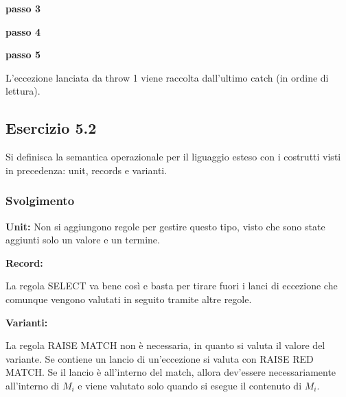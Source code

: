 \textbf{passo 3} 
\begin{prooftree}    
\end{prooftree}

\textbf{passo 4} 
\begin{prooftree}    
\end{prooftree}

\textbf{passo 5} 
\begin{prooftree}    
\end{prooftree}
 
L'eccezione lanciata da throw 1 viene raccolta dall'ultimo catch (in ordine di lettura).

\subsection*{Esercizio 5.2}
Si definisca la semantica operazionale per il liguaggio esteso con i costrutti visti in precedenza: unit, records e varianti.

\subsubsection*{Svolgimento}

\textbf{Unit:} 
Non si aggiungono regole per gestire questo tipo, visto che sono state aggiunti solo un valore e un termine.

\textbf{Record:} 

\begin{prooftree}    
\end{prooftree} 

La regola SELECT va bene cos\`i e basta per tirare fuori i lanci di eccezione che comunque vengono valutati in seguito tramite altre regole.

\begin{prooftree}    
\end{prooftree} 


\textbf{Varianti:} 

La regola RAISE MATCH non \`e necessaria, in quanto si valuta il valore del variante. Se contiene un lancio di un'eccezione si valuta con RAISE RED MATCH. Se il lancio \`e all'interno del match, allora dev'essere necessariamente all'interno di $M_i$ e viene valutato solo quando si esegue il contenuto di $M_i$.

